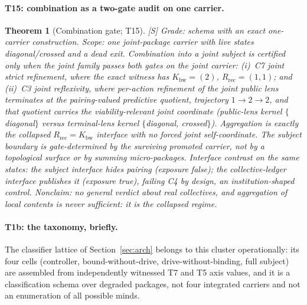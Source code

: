 \documentclass[11pt]{article}
\newcommand{\gradeS}{\textsf{[S]}}
\newcommand{\Kbw}{K_{\mathrm{bw}}}
\newcommand{\Rrec}{R_{\mathrm{rec}}}
\newtheorem{theorem}{Theorem}[section]
\theoremstyle{definition}
\begin{document}
\paragraph{T15: combination as a two-gate audit on one carrier.}
\begin{theorem}[Combination gate; T15]
\gradeS{} \emph{Grade:} schema with an exact one-carrier construction.
\emph{Scope:} one joint-package carrier with live states
\emph{diagonal}/\emph{crossed} and a dead exit. Combination into a joint
subject is certified only when the joint family passes both gates on the
\emph{joint} carrier: (i)~C7 joint strict refinement, where the exact witness has
$\Kbw = (2)$, $\Rrec = (1,1)$; and (ii)~C3 joint reflexivity, where per-action
refinement of the joint public lens terminates at the pairing-valued
predictive quotient, trajectory $1 \to 2 \to 2$, and that quotient carries the
viability-relevant joint coordinate (public-lens kernel $\{$diagonal$\}$
versus terminal-lens kernel $\{$diagonal, crossed$\}$). Aggregation is
exactly the collapsed $\Rrec = \Kbw$ interface with no forced joint
self-coordinate. The subject boundary is gate-determined by the surviving
promoted carrier, not by a topological surface or by summing micro-packages.
Interface contrast on the same states: the subject interface hides pairing
(exposure false); the collective-ledger interface publishes it (exposure
true), failing C4 by design, an institution-shaped control.
\emph{Nonclaim:} no general verdict about real collectives, and aggregation
of local contents is never sufficient: it is the collapsed regime.
\end{theorem}

\paragraph{T1b: the taxonomy, briefly.}
The classifier lattice of Section~\ref{sec:arch} belongs to this cluster
operationally: its four cells (controller, bound-without-drive,
drive-without-binding, full subject) are assembled from independently
witnessed T7 and T5 axis values, and it is a classification schema over
degraded packages, not four integrated carriers and not an enumeration of
all possible minds.
\end{document}
